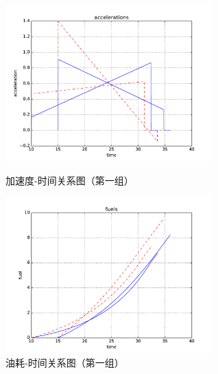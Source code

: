 \begin{figure}[htbp]
\begin{minipage}{0.48\textwidth}
  \centering
  \includegraphics[height=6cm]{figures/sim_case1/acc.pdf}
  \caption{加速度-时间关系图（第一组）}
  \label{fig:case1:acc}
\end{minipage}\hfill
\begin{minipage}{0.48\textwidth}
  \centering
  \includegraphics[height=6cm]{figures/sim_case1/fuel.pdf}
  \caption{油耗-时间关系图（第一组）}
  \label{fig:case1:fuel}
\end{minipage}
\end{figure}

